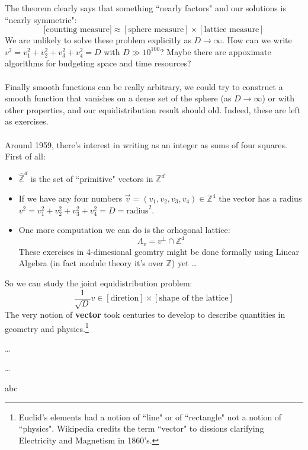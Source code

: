 \documentclass[12pt]{article}
\begin{document}
{The theorem clearly says that something ``nearly factors" and our solutions is ``nearly symmetric":
$$[\text{counting measure]} \approx [\text{sphere measure}] \times [\text{lattice measure}] $$
We are unlikely to solve these problem explicitly as $D \to \infty$.  How can we write $v^2 = v_1^2 + v_2^2 + v_3^2 + v_4^2 = D$ with $D \gg 10^{100}$?  Maybe there are appoximate algorithms for budgeting space and time resources? \\ \\
Finally smooth functions can be really arbitrary, we could try to construct a smooth function that vanishes on a dense set of the sphere (as $D \to \infty$) or with other properties, and our equidistribution result should old.  Indeed, these are left as exercises. \\ \\
Around 1959, there's interest in writing as an integer as sums of four squares.  First of all:
\begin{itemize}
\item $\widehat{\mathbb{Z}}^d$ is the set of ``primitive" vectors in $\mathbb{Z}^d$
\item If we have any four numbers $\vec{v} = (v_1, v_2, v_3, v_4) \in \mathbb{Z}^4 $ the vector has a radius $v^2 = v_1^2 + v_2^2 + v_3^2 + v_4^2 = D = \text{radius}^2$.
\item One more computation we can do is the orhogonal lattice: $$\Lambda_v =v^\perp \cap \mathbb{Z}^4 $$
These exercises in 4-dimesional geomtry might be done formally using Linear Algebra (in fact module theory it's over $\mathbb{Z}$) yet \dots 
\end{itemize}
So we can study the joint equidistribution problem:
$$ \frac{1}{\sqrt{D}} v \in  [\text{diretion}] \times [\text{shape of the lattice}] $$
The very notion of \textbf{vector} took centuries to develop to describe quantities in geometry and physics.\footnote{Euclid's elements had a notion of ``line" or of ``rectangle" not a notion of ``physics".  Wikipedia credits the term ``vector" to dissions clarifying Electricity and Magnetism in 1860's.}
\vfill

\begin{thebibliography}{}

\item \dots
\item \dots 

\end{thebibliography}

\newpage

\noindent abc

}
\end{document}
